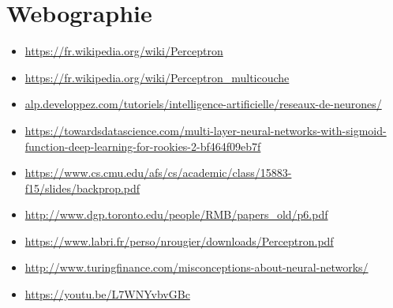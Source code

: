 \documentclass[11pt]{article}
\begin{document}
\section{Webographie} 
\begin{itemize}
\item \url{https://fr.wikipedia.org/wiki/Perceptron} \newline
\item \url{https://fr.wikipedia.org/wiki/Perceptron_multicouche} \newline
\item \url{alp.developpez.com/tutoriels/intelligence-artificielle/reseaux-de-neurones/} \newline
\item \url{https://towardsdatascience.com/multi-layer-neural-networks-with-sigmoid-function-deep-learning-for-rookies-2-bf464f09eb7f} \newline
\item \url{https://www.cs.cmu.edu/afs/cs/academic/class/15883-f15/slides/backprop.pdf} \newline
\item \url{http://www.dgp.toronto.edu/people/RMB/papers_old/p6.pdf} \newline
\item \url{https://www.labri.fr/perso/nrougier/downloads/Perceptron.pdf} \newline
\item \url{ http://www.turingfinance.com/misconceptions-about-neural-networks/} \newline
\item \url{https://youtu.be/L7WNYvbvGBc} \newline
\end{itemize}
\end{document}
